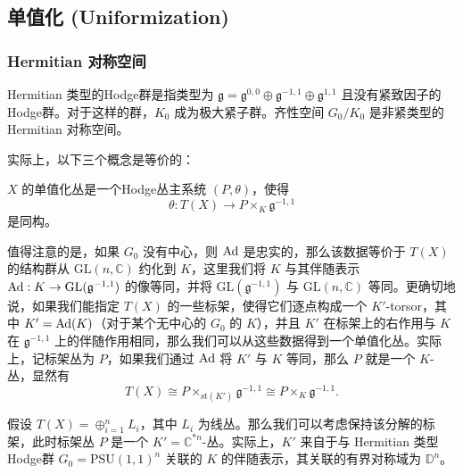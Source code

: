 \subsection{单值化 (Uniformization)}

\subsubsection*{Hermitian 对称空间}

\begin{definition}
Hermitian 类型的Hodge群是指类型为 $\mathfrak{g} = \mathfrak{g}^{0,0} \oplus \mathfrak{g}^{-1,1} \oplus \mathfrak{g}^{1,1}$ 且没有紧致因子的Hodge群。对于这样的群，$K_0$ 成为极大紧子群。齐性空间 $G_0/K_0$ 是非紧类型的 Hermitian 对称空间。
\end{definition}

实际上，以下三个概念是等价的：
\begin{center}
\end{center}

\begin{definition}
$X$ 的单值化丛是一个Hodge丛主系统 $(P, \theta)$，使得
\[ \theta: T(X) \to P \times_K \mathfrak{g}^{-1,1} \]
是同构。
\end{definition}

值得注意的是，如果 $G_0$ 没有中心，则 $\operatorname{Ad}$ 是忠实的，那么该数据等价于 $T(X)$ 的结构群从 $\mathrm{GL}(n, \mathbb{C})$ 约化到 $K$，这里我们将 $K$ 与其伴随表示 $\operatorname{Ad}: K \to \mathrm{GL}(\mathfrak{g}^{-1,1})$ 的像等同，并将 $\mathrm{GL}(\mathfrak{g}^{-1,1})$ 与 $\mathrm{GL}(n, \mathbb{C})$ 等同。更确切地说，如果我们能指定 $T(X)$ 的一些标架，使得它们逐点构成一个 $K'$-torsor，其中 $K' = \operatorname{Ad}(K)$（对于某个无中心的 $G_0$ 的 $K$），并且 $K'$ 在标架上的右作用与 $K$ 在 $\mathfrak{g}^{-1,1}$ 上的伴随作用相同，那么我们可以从这些数据得到一个单值化丛。实际上，记标架丛为 $P$，如果我们通过 $\operatorname{Ad}$ 将 $K'$ 与 $K$ 等同，那么 $P$ 就是一个 $K$-丛，显然有
\[ T(X) \cong P \times_{\text{st}(K')} \mathfrak{g}^{-1,1} \cong P \times_K \mathfrak{g}^{-1,1}. \]

\begin{example}
假设 $T(X) = \oplus_{i=1}^n L_i$，其中 $L_i$ 为线丛。那么我们可以考虑保持该分解的标架，此时标架丛 $P$ 是一个 $K' = \mathbb{C}^{*n}$-丛。实际上，$K'$ 来自于与 Hermitian 类型Hodge群 $G_0 = \mathrm{PSU}(1,1)^n$ 关联的 $K$ 的伴随表示，其关联的有界对称域为 $\mathbb{D}^n$。
\end{example}

